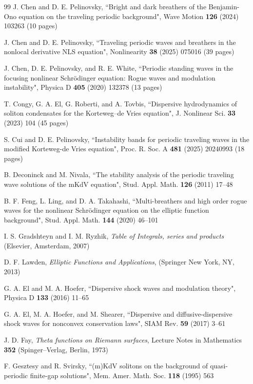 \documentclass[12pt,reqno]{amsart}
\numberwithin{equation}{section}
\begin{document}
\begin{thebibliography}{99}
 J. Chen and D. E. Pelinovsky, ``Bright and dark breathers of the Benjamin-Ono equation on the traveling periodic background", Wave Motion {\bf 126} (2024) 103263 (10 pages)

 J. Chen and D. E. Pelinovsky, ``Traveling periodic waves and breathers in the nonlocal derivative NLS equation", Nonlinearity {\bf 38} (2025) 075016 (39 pages)

 J. Chen, D. E. Pelinovsky, and R. E. White, ``Periodic standing waves in the focusing nonlinear Schr\"{o}dinger equation: Rogue waves and modulation instability", Physica D {\bf 405} (2020) 132378 (13 pages)

 T. Congy, G. A. El, G. Roberti, and A. Tovbis, ``Dispersive hydrodynamics of soliton condensates for the Korteweg–de Vries equation",
J. Nonlinear Sci. {\bf 33} (2023) 104 (45 pages)

 S. Cui and D. E. Pelinovsky, ``Instability bands for periodic traveling waves in the modified Korteweg-de Vries equation", Proc. R. Soc. A {\bf 481} (2025) 20240993 (18 pages)

 B. Deconinck and M. Nivala, ``The stability analysis of the periodic traveling wave solutions of the mKdV equation", 
Stud. Appl. Math. {\bf 126}  (2011) 17--48

 B. F. Feng, L. Ling, and D. A. Takahashi,
``Multi-breathers and high order rogue
waves for the nonlinear Schr\"{o}dinger equation on the elliptic function
background", Stud. Appl. Math. {\bf 144} (2020) 46--101
	
	 I. S. Gradshteyn and I. M. Ryzhik, {\it Table of Integrals, series and products} (Elsevier, Amsterdam, 2007)
	
	 D. F. Lawden, {\em Elliptic Functions and Applications}, (Springer New York, NY, 2013)
	
	  G. A. El and M. A. Hoefer, ``Dispersive shock waves and modulation theory", Physica D {\bf 133} (2016) 11--65
	
	 G. A. El, M. A. Hoefer, and M. Shearer, ``Dispersive and diffusive-dispersive shock waves for nonconvex conservation laws", 
	SIAM Rev. {\bf 59} (2017)  3--61
	
	 J. D. Fay, {\em Theta functions on Riemann surfaces}, 
	Lecture Notes in Mathematics {\bf 352} (Spinger--Verlag, Berlin, 1973)
			
	 F. Gesztesy and R. Svirsky, ``(m)KdV solitons on the background of quasi-periodic finite-gap	solutions", 
	Mem. Amer. Math. Soc. {\bf 118} (1995) 563
	

\end{thebibliography}
\end{document}
